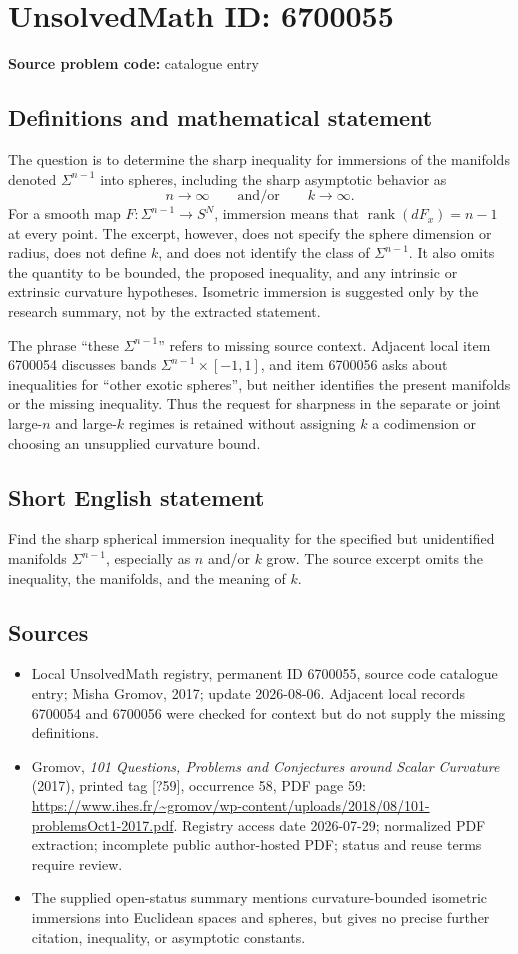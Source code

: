 \documentclass[11pt]{article}
\begin{document}
\section*{UnsolvedMath ID: 6700055}
\textbf{Source problem code:} catalogue entry
\subsection{Definitions and mathematical statement}
The question is to determine the sharp inequality for immersions of the manifolds denoted \(\Sigma^{n-1}\) into spheres, including the sharp asymptotic behavior as
\[
 n\to\infty\qquad\text{and/or}\qquad k\to\infty.
\]
For a smooth map \(F:\Sigma^{n-1}\to S^N\), immersion means that \(\operatorname{rank}(dF_x)=n-1\) at every point. The excerpt, however, does not specify the sphere dimension or radius, does not define \(k\), and does not identify the class of \(\Sigma^{n-1}\). It also omits the quantity to be bounded, the proposed inequality, and any intrinsic or extrinsic curvature hypotheses. Isometric immersion is suggested only by the research summary, not by the extracted statement.

The phrase ``these \(\Sigma^{n-1}\)'' refers to missing source context. Adjacent local item 6700054 discusses bands \(\Sigma^{n-1}\times[-1,1]\), and item 6700056 asks about inequalities for ``other exotic spheres'', but neither identifies the present manifolds or the missing inequality. Thus the request for sharpness in the separate or joint large-\(n\) and large-\(k\) regimes is retained without assigning \(k\) a codimension or choosing an unsupplied curvature bound.
\subsection{Short English statement}
Find the sharp spherical immersion inequality for the specified but unidentified manifolds \(\Sigma^{n-1}\), especially as \(n\) and/or \(k\) grow. The source excerpt omits the inequality, the manifolds, and the meaning of \(k\).
\subsection{Sources}
\begin{itemize}
\item Local UnsolvedMath registry, permanent ID 6700055, source code catalogue entry; Misha Gromov, 2017; update 2026-08-06. Adjacent local records 6700054 and 6700056 were checked for context but do not supply the missing definitions.
\item Gromov, \emph{101 Questions, Problems and Conjectures around Scalar Curvature} (2017), printed tag [?59], occurrence 58, PDF page 59: \url{https://www.ihes.fr/~gromov/wp-content/uploads/2018/08/101-problemsOct1-2017.pdf}. Registry access date 2026-07-29; normalized PDF extraction; incomplete public author-hosted PDF; status and reuse terms require review.
\item The supplied open-status summary mentions curvature-bounded isometric immersions into Euclidean spaces and spheres, but gives no precise further citation, inequality, or asymptotic constants.
\end{itemize}
\end{document}
